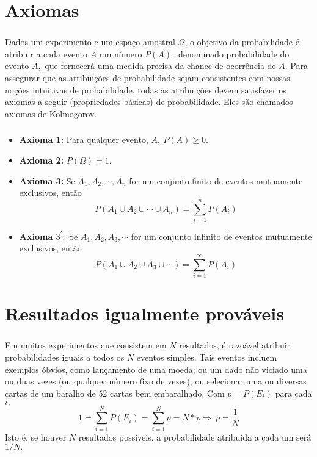 \documentclass[14pt,aspectratio=1610]{beamer}
\begin{document}
\section{Axiomas}
\begin{frame}{}
\frametitle{}
\begin{block}{}
\justifying
Dados um experimento e um espaço amostral $\Omega$, o objetivo da probabilidade é atribuir a cada evento $A$ um número $P(A),$ denominado probabilidade do evento $A,$ que fornecerá uma medida precisa da chance de ocorrência de $A.$ Para assegurar que as atribuições de probabilidade sejam consistentes com nossas noções intuitivas de probabilidade, todas as atribuições devem satisfazer os axiomas a seguir (propriedades básicas) de probabilidade. Eles são chamados axiomas de Kolmogorov.
\end{block}
\end{frame}

\begin{frame}{}
\frametitle{}
\centering
\begin{itemize}
\item{\bf Axioma 1:} Para qualquer evento, $A,\ P(A)\geq 0.$\pause
\item{\bf Axioma 2:} $P(\Omega)=1.$ \pause
\item{\bf Axioma 3:} Se $A_{1},A_{2},\cdots,A_{n}$ for um conjunto finito de eventos mutuamente exclusivos, então $$P(A_{1}\cup A_{2}\cup \cdots \cup A_{n})={\displaystyle \sum_{i=1}^{n}P(A_{i})}$$\pause
\item{\bf Axioma $3^{'}:$} Se $A_{1},A_{2},A_{3},\cdots$ for um conjunto infinito de eventos mutuamente exclusivos, então $$P(A_{1}\cup A_{2}\cup A_{3}\cup\cdots )={\displaystyle \sum_{i=1}^{\infty}P(A_{i})}$$
\end{itemize}
\end{frame}

\section{Resultados igualmente prováveis}
\begin{frame}{}
\frametitle{}
\begin{block}{}
\justifying
Em muitos experimentos que consistem em $N$ resultados, é razoável atribuir probabilidades iguais a todos os $N$ eventos simples. Tais eventos incluem exemplos óbvios, como lançamento de uma moeda; ou um dado não viciado uma ou duas vezes (ou qualquer número fixo de vezes); ou selecionar uma ou diversas cartas de um baralho de $52$ cartas bem embaralhado. Com $p=P(E_{i})$ para cada $i,$
$${\displaystyle 1=\sum_{i=1}^{N}P(E_{i})=\sum_{i=1}^{N}p=N*p\Rightarrow\ p=\dfrac{1}{N}}$$
Isto é, se houver $N$ resultados possíveis, a probabilidade atribuída a cada um será $1/N.$ 
\end{block}
\end{frame}
\end{document}
